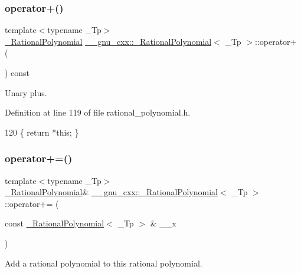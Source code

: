 \subsubsection{\texorpdfstring{operator+()}{operator+()}}
{\footnotesize\ttfamily template$<$typename \+\_\+\+Tp$>$ \\
\hyperlink{class____gnu__cxx_1_1__RationalPolynomial}{\+\_\+\+Rational\+Polynomial} \hyperlink{class____gnu__cxx_1_1__RationalPolynomial}{\+\_\+\+\_\+gnu\+\_\+cxx\+::\+\_\+\+Rational\+Polynomial}$<$ \+\_\+\+Tp $>$\+::operator+ (\begin{DoxyParamCaption}{ }\end{DoxyParamCaption}) const\hspace{0.3cm}{\ttfamily [inline]}}

Unary plus. 

Definition at line 119 of file rational\+\_\+polynomial.\+h.


\begin{DoxyCode}
120       \{ \textcolor{keywordflow}{return} *\textcolor{keyword}{this}; \}
\end{DoxyCode}
\mbox{\label{class____gnu__cxx_1_1__RationalPolynomial_a04b822ad014e4c38bcaf609b48176c13}} 
\subsubsection{\texorpdfstring{operator+=()}{operator+=()}}
{\footnotesize\ttfamily template$<$typename \+\_\+\+Tp$>$ \\
\hyperlink{class____gnu__cxx_1_1__RationalPolynomial}{\+\_\+\+Rational\+Polynomial}\& \hyperlink{class____gnu__cxx_1_1__RationalPolynomial}{\+\_\+\+\_\+gnu\+\_\+cxx\+::\+\_\+\+Rational\+Polynomial}$<$ \+\_\+\+Tp $>$\+::operator+= (\begin{DoxyParamCaption}\item[{const \hyperlink{class____gnu__cxx_1_1__RationalPolynomial}{\+\_\+\+Rational\+Polynomial}$<$ \+\_\+\+Tp $>$ \&}]{\+\_\+\+\_\+x }\end{DoxyParamCaption})\hspace{0.3cm}{\ttfamily [inline]}}

Add a rational polynomial to this rational polynomial. 

